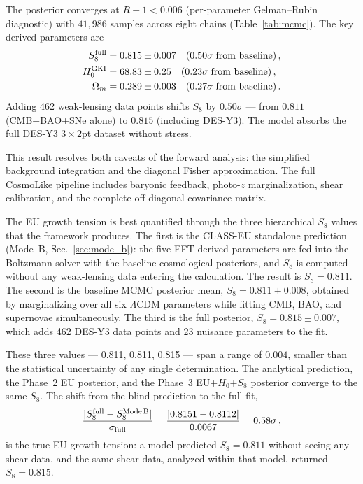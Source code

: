 \documentclass[a4paper,fleqn]{cas-dc}
\begin{document}
The posterior converges at $R-1 < 0.006$
(per-parameter Gelman--Rubin diagnostic) with
$41{,}986$ samples across eight chains
(Table~\ref{tab:mcmc}).
The key derived parameters are
\begin{align}
S_8^{\rm full} &= 0.815 \pm 0.007
  \quad (0.50\sigma\;\text{from baseline})\,,
  \notag \\
H_0^{\rm GKI} &= 68.83 \pm 0.25
  \quad (0.23\sigma\;\text{from baseline})\,,
  \notag \\
\Omega_m &= 0.289 \pm 0.003
  \quad (0.27\sigma\;\text{from baseline})\,.
\label{eq:d2_params}
\end{align}
Adding 462 weak-lensing data points shifts $S_8$ by
$0.50\sigma$ --- from $0.811$ (CMB+BAO+SNe alone) to
$0.815$ (including DES-Y3). The model absorbs the
full DES-Y3 $3 \times 2$pt dataset without stress.

This result resolves both caveats of the forward
analysis: the simplified background
integration and the diagonal Fisher approximation. The
full CosmoLike pipeline includes baryonic feedback,
photo-$z$ marginalization, shear calibration, and the
complete off-diagonal covariance matrix.

The EU growth tension is best quantified through the
three hierarchical $S_8$ values that the framework
produces. The first is the CLASS-EU standalone
prediction (Mode~B, Sec.~\ref{sec:mode_b}):
the five EFT-derived parameters are fed into the
Boltzmann solver with the baseline cosmological posteriors,
and $S_8$ is computed without any weak-lensing data
entering the calculation. The result is $S_8 = 0.811$.
The second is the baseline MCMC posterior mean,
$S_8 = 0.811 \pm 0.008$, obtained by marginalizing
over all six $\Lambda$CDM parameters while fitting
CMB, BAO, and supernovae simultaneously. The third is
the full posterior, $S_8 = 0.815 \pm 0.007$, which
adds 462 DES-Y3 data points and 23 nuisance parameters
to the fit.

These three values --- 0.811, 0.811, 0.815 --- span a
range of $0.004$, smaller than the statistical
uncertainty of any single determination. The analytical
prediction, the Phase~2 EU posterior, and the Phase~3
EU+$H_0$+$S_8$ posterior converge to the same $S_8$. The
shift from the blind prediction to the full fit,
\begin{equation}
\frac{|S_8^{\rm full} - S_8^{\rm Mode\,B}|}
     {\sigma_{\rm full}}
= \frac{|0.8151 - 0.8112|}{0.0067} = 0.58\sigma\,,
\label{eq:s8_tension_eu}
\end{equation}
is the true EU growth tension: a model predicted
$S_8 = 0.811$ without seeing any shear data, and the
same shear data, analyzed within that model, returned
$S_8 = 0.815$.
\end{document}

